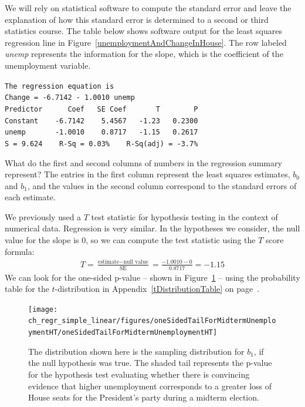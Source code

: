 We will rely on statistical software to compute the standard error and leave the explanation of how this standard error is determined to a second or third statistics course. The table below shows software output for the least squares regression line in Figure~\ref{unemploymentAndChangeInHouse}. The row labeled \emph{unemp} represents the information for the slope, which is the coefficient of the unemployment variable.

\begin{tipBox}{\texttt{The regression equation is} \\

\texttt{Change = -6.7142 - 1.0010 unemp} \\

\texttt{Predictor \ \ \ \ \ Coef \ \ SE Coef \ \ \ \ \ \ T \ \ \ \ \ \ \ P} \\
\texttt{Constant \ \ \ -6.7142 \ \ \ 5.4567 \ \ -1.23 \ \ 0.2300} \\
\texttt{unemp \ \ \ \ \ \ -1.0010 \ \ \ 0.8717 \ \ -1.15 \ \ 0.2617} \\

\texttt{S = 9.624\ \ \ \ R-Sq = 0.03\% \ \ \ R-Sq(adj) = -3.7\%}}
\end{tipBox}

\begin{example}{What do the first and second columns of numbers in the regression summary represent?}
The entries in the first column represent the least squares estimates, $b_0$ and $b_1$, and the values in the second column correspond to the standard errors of each estimate.
\end{example}

We previously used a $T$ test statistic for hypothesis testing in the context of numerical data. Regression is very similar. In the hypotheses we consider, the null value for the slope is 0, so we can compute the test statistic using the $T$ score formula:
\begin{align*}
T = \frac{\text{estimate} - \text{null value}}{\text{SE}} = \frac{-1.0010 - 0}{0.8717} = -1.15
\end{align*}
We can look for the one-sided p-value -- shown in Figure~\ref{oneSidedTailForMidtermUnemploymentHT} -- using the probability table for the $t$-distribution in Appendix~\ref{tDistributionTable} on page~\pageref{tDistributionTable}.

\begin{figure}
\centering
\texttt{[image: ch\_regr\_simple\_linear/figures/oneSidedTailForMidtermUnemploymentHT/oneSidedTailForMidtermUnemploymentHT]}
\caption{The distribution shown here is the sampling distribution for $b_1$, if the null hypothesis was true. The shaded tail represents the p-value for the hypothesis test evaluating whether there is convincing evidence that higher unemployment corresponds to a greater loss of House seats for the President's party during a midterm election.}
\label{oneSidedTailForMidtermUnemploymentHT}
\end{figure}

